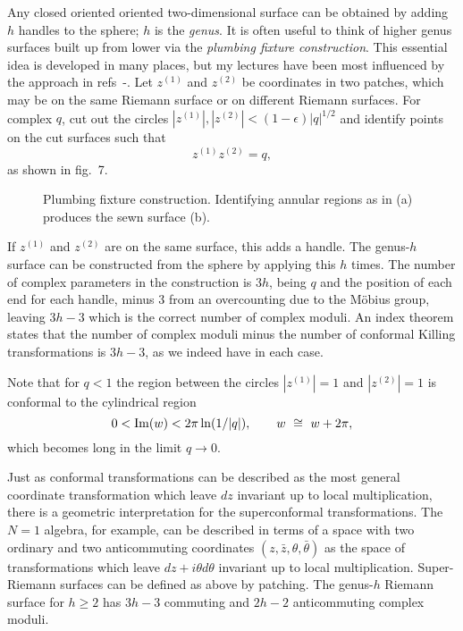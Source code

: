 Any closed oriented oriented two-dimensional surface can be
obtained by adding $h$ handles to the sphere; $h$ is the {\it
genus}.  It is often useful to think of higher genus surfaces built
up from lower via the {\it plumbing fixture construction}.
This essential idea is developed in many places, but my
lectures have been most influenced by the approach in
refs~\cite{V1}-\cite{Son}.  Let
$z^{(1)}$ and $z^{(2)}$ be coordinates in two patches, which may be
on the same Riemann surface or on different Riemann surfaces.  For
complex
$q$, cut out the circles $|z^{(1)}|, |z^{(2)}|
< (1-\epsilon) |q|^{1/2}$
and identify points on the cut surfaces such that
\begin{equation}
z^{(1)} z^{(2)} = q,
\end{equation}
as shown in fig.~7.
\begin{figure}
\begin{center}
\leavevmode
{}
\end{center}
\caption[]{Plumbing fixture construction.  Identifying annular
regions as in (a) produces the sewn surface (b).} 
\end{figure}
If $z^{(1)}$ and $z^{(2)}$
are on the same surface, this
adds a handle.  The genus-$h$ surface can be constructed from the
sphere by applying this $h$ times.  The number of complex parameters
in the construction is $3h$, being $q$ and the position of each end
for each handle, minus 3 from an overcounting due to the
M\"obius group, leaving $3h-3$ which is the correct number of
complex moduli.  An index theorem states that the number of complex
moduli minus the number of conformal Killing transformations is
$3h - 3$, as we indeed have in each case.

Note that for $q < 1$ the region between the circles $|z^{(1)}| = 1$
and
$|z^{(2)}| = 1$ is conformal to the cylindrical region
\begin{equation}
0 < {\rm Im}(w) < 2\pi \ln(1/|q|), \qquad w\ \cong\  w+2\pi,
\end{equation}
which becomes long in the limit $q\to 0$.

Just as conformal transformations can be described as the most
general coordinate transformation which leave $dz$ invariant up to
local multiplication, there is a geometric interpretation for the
superconformal transformations.  The $N=1$ algebra, for example,
can be described in terms of a space with two ordinary and two
anticommuting coordinates $(z,\bar z
,\theta,\bar\theta)$ as the
space of transformations which leave $dz + i\theta
d\theta$ invariant up to local multiplication.  Super-Riemann
surfaces can be defined as above by patching.  The genus-$h$
Riemann surface for $h \geq 2$ has $3h-3$ commuting and
$2h - 2$ anticommuting complex moduli.

